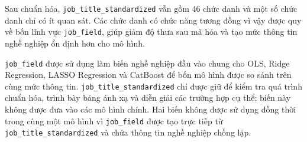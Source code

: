 Sau chuẩn hóa, \texttt{job\_title\_standardized} vẫn gồm 46 chức danh và
một số chức danh chỉ có ít quan sát. Các chức danh có chức năng tương
đồng vì vậy được quy về bốn lĩnh vực \texttt{job\_field}, giúp giảm độ
thưa sau mã hóa và tạo mức thông tin nghề nghiệp ổn định hơn cho mô
hình.

\texttt{job\_field} được sử dụng làm biến nghề nghiệp đầu vào chung cho
OLS, Ridge Regression, LASSO Regression và CatBoost để bốn mô hình được
so sánh trên cùng mức thông tin. \texttt{job\_title\_standardized} chỉ
được giữ để kiểm tra quá trình chuẩn hóa, trình bày bảng ánh xạ và diễn
giải các trường hợp cụ thể; biến này không được đưa vào các mô hình
chính. Hai biến không được sử dụng đồng thời trong cùng một mô hình vì
\texttt{job\_field} được tạo trực tiếp từ
\texttt{job\_title\_standardized} và chứa thông tin nghề nghiệp chồng
lặp.

